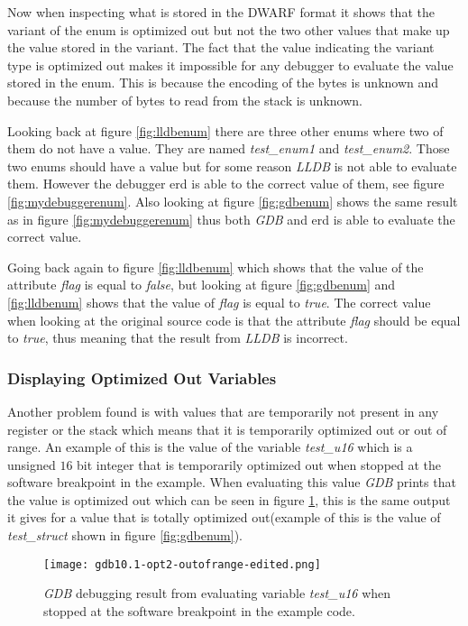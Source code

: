 Now when inspecting what is stored in the \gls{DWARF} format it shows that the variant of the enum is optimized out but not the two other values that make up the value stored in the variant.
The fact that the value indicating the variant type is optimized out makes it impossible for any debugger to evaluate the value stored in the enum.
This is because the encoding of the bytes is unknown and because the number of bytes to read from the stack is unknown.


Looking back at figure \ref{fig:lldbenum} there are three other enums where two of them do not have a value.
They are named \emph{test\_enum1} and \emph{test\_enum2}.
Those two enums should have a value but for some reason \emph{LLDB} is not able to evaluate them.
However the debugger \gls{erd} is able to the correct value of them, see figure \ref{fig:mydebuggerenum}.
Also looking at figure \ref{fig:gdbenum} shows the same result as in figure \ref{fig:mydebuggerenum} thus both \emph{GDB} and \gls{erd} is able to evaluate the correct value.


Going back again to figure \ref{fig:lldbenum} which shows that the value of the attribute \emph{flag} is equal to \emph{false}, but looking at figure \ref{fig:gdbenum} and \ref{fig:lldbenum} shows that the value of \emph{flag} is equal to \emph{true}.
The correct value when looking at the original source code is that the attribute \emph{flag} should be equal to \emph{true}, thus meaning that the result from \emph{LLDB} is incorrect.



\subsubsection{Displaying Optimized Out Variables}
Another problem found is with values that are temporarily not present in any register or the stack which means that it is temporarily optimized out or out of range.
An example of this is the value of the variable \emph{test\_u16} which is a unsigned $16$ bit integer that is temporarily optimized out when stopped at the software breakpoint in the example.
When evaluating this value \emph{GDB} prints that the value is optimized out which can be seen in figure \ref{fig:gdboutofrange}, this is the same output it gives for a value that is totally optimized out(example of this is the value of \emph{test\_struct} shown in figure \ref{fig:gdbenum}).


\begin{figure}[h]
	\centering
	\texttt{[image: gdb10.1-opt2-outofrange-edited.png]}
	\caption{\emph{GDB} debugging result from evaluating variable \emph{test\_u16} when stopped at the software breakpoint in the example code.}
	\label{fig:gdboutofrange}
\end{figure}


